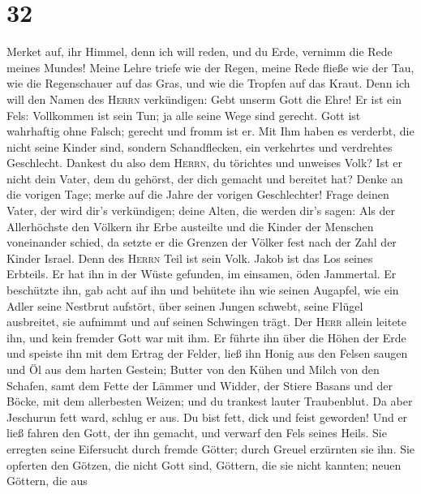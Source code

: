 \hypertarget{section-31}{%
\section{32}\label{section-31}}

 Merket auf, ihr Himmel, denn ich will reden, und du Erde,
vernimm die Rede meines Mundes!  Meine Lehre triefe wie
der Regen, meine Rede fließe wie der Tau, wie die Regenschauer auf das
Gras, und wie die Tropfen auf das Kraut.  Denn ich will
den Namen des \textsc{Herrn} verkündigen: Gebt unserm Gott die Ehre!
 Er ist ein Fels: Vollkommen ist sein Tun; ja alle seine
Wege sind gerecht. Gott ist wahrhaftig ohne Falsch; gerecht und fromm
ist er.  Mit Ihm haben es verderbt, die nicht seine Kinder
sind, sondern Schandflecken, ein verkehrtes und verdrehtes Geschlecht.
 Dankest du also dem \textsc{Herrn}, du törichtes und
unweises Volk? Ist er nicht dein Vater, dem du gehörst, der dich gemacht
und bereitet hat?  Denke an die vorigen Tage; merke auf
die Jahre der vorigen Geschlechter! Frage deinen Vater, der wird dir's
verkündigen; deine Alten, die werden dir's sagen:  Als der
Allerhöchste den Völkern ihr Erbe austeilte und die Kinder der Menschen
voneinander schied, da setzte er die Grenzen der Völker fest nach der
Zahl der Kinder Israel.  Denn des \textsc{Herrn} Teil ist
sein Volk. Jakob ist das Los seines Erbteils.  Er hat ihn
in der Wüste gefunden, im einsamen, öden Jammertal. Er beschützte ihn,
gab acht auf ihn und behütete ihn wie seinen Augapfel, 
wie ein Adler seine Nestbrut aufstört, über seinen Jungen schwebt, seine
Flügel ausbreitet, sie aufnimmt und auf seinen Schwingen trägt.
 Der \textsc{Herr} allein leitete ihn, und kein fremder
Gott war mit ihm.  Er führte ihn über die Höhen der Erde
und speiste ihn mit dem Ertrag der Felder, ließ ihn Honig aus den Felsen
saugen und Öl aus dem harten Gestein;  Butter von den
Kühen und Milch von den Schafen, samt dem Fette der Lämmer und Widder,
der Stiere Basans und der Böcke, mit dem allerbesten Weizen; und du
trankest lauter Traubenblut.  Da aber Jeschurun fett
ward, schlug er aus. Du bist fett, dick und feist geworden! Und er ließ
fahren den Gott, der ihn gemacht, und verwarf den Fels seines Heils.
 Sie erregten seine Eifersucht durch fremde Götter; durch
Greuel erzürnten sie ihn.  Sie opferten den Götzen, die
nicht Gott sind, Göttern, die sie nicht kannten; neuen Göttern, die aus
